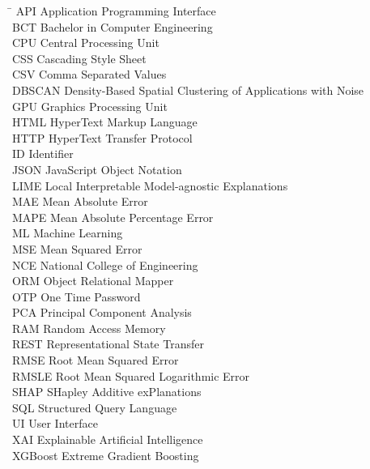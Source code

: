 \documentclass[12pt, a4paper]{report}
\numberwithin{figure}{chapter}
\numberwithin{table}{chapter}
\numberwithin{equation}{chapter}
\begin{document}
\begin{tabbing}
\hspace{3cm} \= \kill
API \> Application Programming Interface \\
BCT \> Bachelor in Computer Engineering \\
CPU \> Central Processing Unit \\
CSS \> Cascading Style Sheet \\
CSV \> Comma Separated Values \\
DBSCAN \> Density-Based Spatial Clustering of Applications with Noise \\
GPU \> Graphics Processing Unit \\
HTML \> HyperText Markup Language \\
HTTP \> HyperText Transfer Protocol \\
ID \> Identifier \\
JSON \> JavaScript Object Notation \\
LIME \> Local Interpretable Model-agnostic Explanations \\
MAE \> Mean Absolute Error \\
MAPE \> Mean Absolute Percentage Error \\
ML \> Machine Learning \\
MSE \> Mean Squared Error \\
NCE \> National College of Engineering \\
ORM \> Object Relational Mapper \\
OTP \> One Time Password \\
PCA \> Principal Component Analysis \\
RAM \> Random Access Memory \\
REST \> Representational State Transfer \\
RMSE \> Root Mean Squared Error \\
RMSLE \> Root Mean Squared Logarithmic Error \\
SHAP \> SHapley Additive exPlanations \\
SQL \> Structured Query Language \\
UI \> User Interface \\
XAI \> Explainable Artificial Intelligence \\
XGBoost \> Extreme Gradient Boosting \\
\end{tabbing}

\newpage

\setcounter{page}{1}
\end{document}
